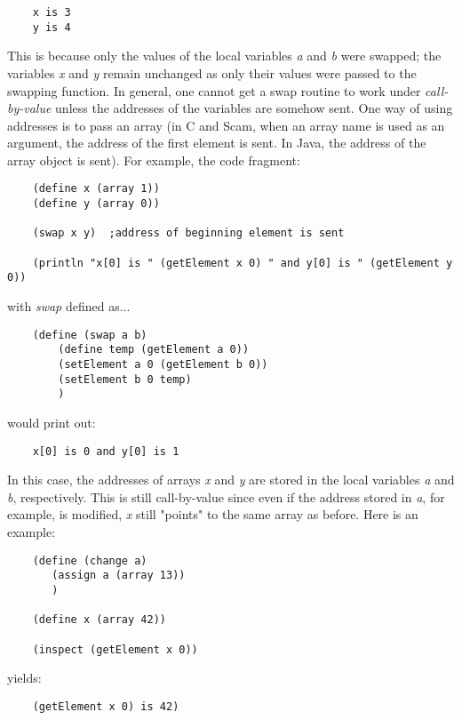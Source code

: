 \begin{verbatim}
    x is 3
    y is 4
\end{verbatim}

This is because only the values of the local variables {\it a} and {\it b}
were swapped; the variables {\it x} and {\it y} remain unchanged
as only their values were passed to the swapping function.
In
general, one cannot get a swap routine to work under {\it call-by-value}
unless the addresses of the variables are somehow sent. One way of
using addresses is to pass an array (in C and Scam, when an array name
is used as an argument, the address of the first element is sent. In Java,
the address of the array
object is sent). For example,
the code fragment:

\begin{verbatim}
    (define x (array 1))
    (define y (array 0))

    (swap x y)  ;address of beginning element is sent

    (println "x[0] is " (getElement x 0) " and y[0] is " (getElement y 0))
\end{verbatim}

with {\it swap} defined as...

\begin{verbatim}
    (define (swap a b)
        (define temp (getElement a 0))
        (setElement a 0 (getElement b 0))
        (setElement b 0 temp)
        )
\end{verbatim}

would print out:

\begin{verbatim}
    x[0] is 0 and y[0] is 1
\end{verbatim}

In this case, the addresses of arrays {\it x} and {\it y}
are stored in the local variables {\it a} and
{\it b}, respectively.
This is
still call-by-value since even if the address stored in {\it a}, for example,
is modified,
{\it x} still "points" to the same array as before. Here is an example:

\begin{verbatim}
    (define (change a)
       (assign a (array 13))
       )

    (define x (array 42))

    (inspect (getElement x 0))
\end{verbatim}

yields:

\begin{verbatim}
    (getElement x 0) is 42)
\end{verbatim}


